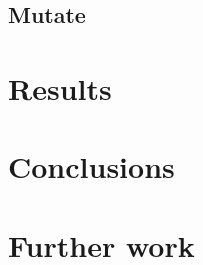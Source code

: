 \documentclass[aps,prl,preprint,groupedaddress,showkeys, nobibnotes]{revtex4-1}
\begin{document}
\subsection{Mutate}

\section{Results}
\section{Conclusions}
\section{Further work}

%


\end{document}
